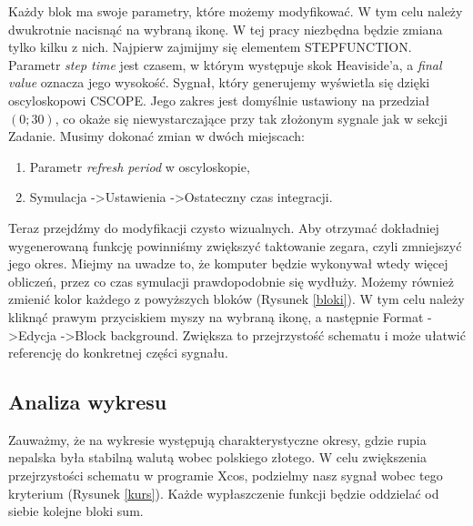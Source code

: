 \documentclass[12pt]{mwart}
\begin{document}
	\noindent Każdy blok ma swoje parametry, które możemy modyfikować. W tym celu należy dwukrotnie nacisnąć na wybraną ikonę. W tej pracy niezbędna będzie zmiana tylko kilku z nich. Najpierw zajmijmy się elementem STEP\textunderscore FUNCTION. Parametr \textit{step time} jest czasem, w którym występuje skok Heaviside'a, a \textit{final value} oznacza jego wysokość. Sygnał, który generujemy wyświetla się dzięki oscyloskopowi CSCOPE. Jego zakres jest domyślnie ustawiony na przedział $(0;30)$, co okaże się niewystarczające przy tak złożonym sygnale jak w  sekcji Zadanie. Musimy dokonać zmian w dwóch miejscach:
	\begin{enumerate}
		\item Parametr \textit{refresh period} w oscyloskopie,
		\item Symulacja -\textgreater Ustawienia -\textgreater Ostateczny czas integracji. \\
	\end{enumerate} 
	\noindent Teraz przejdźmy do modyfikacji czysto wizualnych. Aby otrzymać dokładniej wygenerowaną funkcję powinniśmy zwiększyć taktowanie zegara, czyli zmniejszyć jego okres. Miejmy na uwadze to, że komputer będzie wykonywał wtedy więcej obliczeń, przez co czas symulacji prawdopodobnie się wydłuży. Możemy również zmienić kolor każdego z powyższych bloków (Rysunek \ref{bloki}). W tym celu należy kliknąć prawym przyciskiem myszy na wybraną ikonę, a następnie Format -\textgreater  Edycja -\textgreater  Block background. Zwiększa to przejrzystość schematu i może ułatwić referencję do konkretnej części sygnału.
	
	
	\subsection{Analiza wykresu}	
	\noindent Zauważmy, że na wykresie występują charakterystyczne okresy, gdzie rupia nepalska była stabilną walutą wobec polskiego złotego. W celu zwiększenia przejrzystości schematu w programie Xcos, podzielmy nasz sygnał wobec tego kryterium (Rysunek \ref{kurs}). Każde wypłaszczenie funkcji będzie oddzielać od siebie kolejne bloki sum.
	
\end{document}
